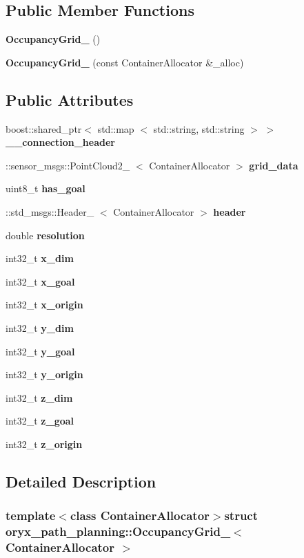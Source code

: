 \subsection*{\-Public \-Member \-Functions}
\begin{DoxyCompactItemize}
\item 
{\bf \-Occupancy\-Grid\-\_\-} ()
\item 
{\bf \-Occupancy\-Grid\-\_\-} (const \-Container\-Allocator \&\-\_\-alloc)
\end{DoxyCompactItemize}
\subsection*{\-Public \-Attributes}
\begin{DoxyCompactItemize}
\item 
boost\-::shared\-\_\-ptr$<$ std\-::map\*
$<$ std\-::string, std\-::string $>$ $>$ {\bf \-\_\-\-\_\-connection\-\_\-header}
\item 
\-::sensor\-\_\-msgs\-::\-Point\-Cloud2\-\_\-\*
$<$ \-Container\-Allocator $>$ {\bf grid\-\_\-data}
\item 
uint8\-\_\-t {\bf has\-\_\-goal}
\item 
\-::std\-\_\-msgs\-::\-Header\-\_\-\*
$<$ \-Container\-Allocator $>$ {\bf header}
\item 
double {\bf resolution}
\item 
int32\-\_\-t {\bf x\-\_\-dim}
\item 
int32\-\_\-t {\bf x\-\_\-goal}
\item 
int32\-\_\-t {\bf x\-\_\-origin}
\item 
int32\-\_\-t {\bf y\-\_\-dim}
\item 
int32\-\_\-t {\bf y\-\_\-goal}
\item 
int32\-\_\-t {\bf y\-\_\-origin}
\item 
int32\-\_\-t {\bf z\-\_\-dim}
\item 
int32\-\_\-t {\bf z\-\_\-goal}
\item 
int32\-\_\-t {\bf z\-\_\-origin}
\end{DoxyCompactItemize}


\subsection{\-Detailed \-Description}
\subsubsection*{template$<$class Container\-Allocator$>$struct oryx\-\_\-path\-\_\-planning\-::\-Occupancy\-Grid\-\_\-$<$ Container\-Allocator $>$}



